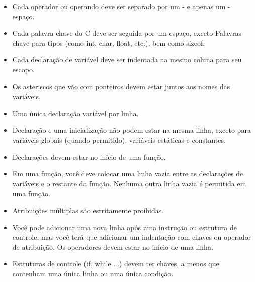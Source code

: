 \documentclass{42-pt}
\begin{document}
\begin{itemize}
                \item Cada operador ou operando deve ser separado por um
                 - e apenas um - espaço.

                \item Cada palavra-chave do C deve ser seguida por um espaço, exceto
                  Palavras-chave para tipos (como int, char, float, etc.),
                  bem como sizeof.

                \item Cada declaração de variável deve ser indentada na mesmo
                  coluna para seu escopo.

                \item Os asteriscos que vão com ponteiros devem estar juntos aos
                  nomes das variáveis.

                \item Uma única declaração variável por linha.

                \item Declaração e uma inicialização não podem estar
                  na mesma linha, exceto para variáveis globais (quando permitido),
                  variáveis estáticas e constantes.

                \item Declarações devem estar no início de uma função.

                \item Em uma função, você deve colocar uma linha vazia entre as
                    declarações de variáveis e o restante da função.
                    Nenhuma outra linha vazia é permitida em uma função.

                \item Atribuições múltiplas são estritamente proibidas.

                \item Você pode adicionar uma nova linha após uma instrução ou
                  estrutura de controle, mas você terá que adicionar um
                  indentação com chaves ou operador de atribuição.
                  Os operadores devem estar no início de uma linha.

                \item Estruturas de controle (if, while ...) devem ter chaves,
                a menos que contenham uma única linha ou uma única condição.

            \end{itemize}
\end{document}
